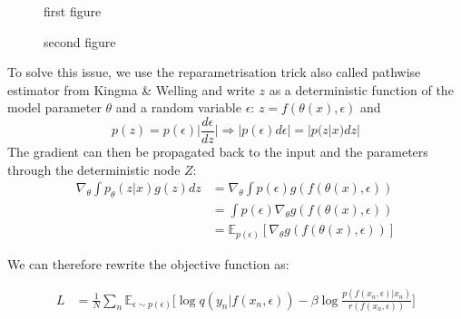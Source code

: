 \documentclass[10pt,oneside,openright]{report}
\begin{document}
\begin{figure}[H]
    \centering
    \begin{minipage}{0.45\textwidth}
        \centering
{}
        \caption{first figure}
    \end{minipage}\hfill
    \begin{minipage}{0.45\textwidth}
        \centering
{}
        \caption{second figure}
    \end{minipage}
\end{figure}

To solve this issue, we use the reparametrisation trick also called pathwise estimator  from Kingma \& Welling \cite{kingma} and write $z$ as a deterministic function of the model parameter $\theta$ and a random variable $\epsilon$: $z = f(\theta(x), \epsilon)$ and
$$p(z) = p(\epsilon) \Big|\frac{d\epsilon}{dz} \Big| \Rightarrow |p(\epsilon) d\epsilon| = |p(z|x) dz|$$
The gradient can then be propagated back to the input and the parameters through the deterministic node $Z$:
\begin{align}
\nabla_\theta \int p_\theta(z|x) g(z) dz &= \nabla_\theta \int p(\epsilon) g(f(\theta(x), \epsilon))\\
&= \int p(\epsilon) \nabla_\theta g(f(\theta(x), \epsilon))\\
&= \mathbb{E}_{p(\epsilon)}[\nabla_\theta g(f(\theta(x), \epsilon))]
\end{align}

We can therefore rewrite the objective function as:

 \begin{align}
L   &= \frac{1}{N}\sum_n  \mathbb{E}_{\epsilon \sim p(\epsilon)}\Big[  \log q(y_n|f(x_n, \epsilon)) - \beta  \log \frac{p(f(x_n, \epsilon)|x_n)}{r(f(x_n, \epsilon))}\Big]  \label{eq:lower2}
\end{align}
\end{document}

